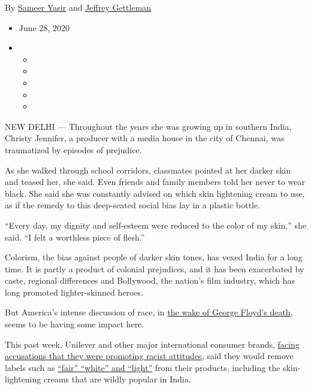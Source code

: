 By \href{https://www.nytimes.com/by/sameer-yasir}{Sameer Yasir} and
\href{https://www.nytimes.com/by/jeffrey-gettleman}{Jeffrey Gettleman}

\begin{itemize}
\item
  June 28, 2020
\item
  \begin{itemize}
  \item
  \item
  \item
  \item
  \item
  \end{itemize}
\end{itemize}

NEW DELHI --- Throughout the years she was growing up in southern India,
Christy Jennifer, a producer with a media house in the city of Chennai,
was traumatized by episodes of prejudice.

As she walked through school corridors, classmates pointed at her darker
skin and teased her, she said. Even friends and family members told her
never to wear black. She said she was constantly advised on which skin
lightening cream to use, as if the remedy to this deep-seated social
bias lay in a plastic bottle.

``Every day, my dignity and self-esteem were reduced to the color of my
skin,'' she said. ``I felt a worthless piece of flesh.''

Colorism, the bias against people of darker skin tones, has vexed India
for a long time. It is partly a product of colonial prejudices, and it
has been exacerbated by caste, regional differences and Bollywood, the
nation's film industry, which has long promoted lighter-skinned heroes.

But America's intense discussion of race, in
\href{https://www.nytimes.com/news-event/george-floyd-protests-minneapolis-new-york-los-angeles?action=click\&pgtype=Article\&state=default\&module=styln-george-floyd\&variant=show\&region=TOP_BANNER\&context=storylines_menu}{the
wake of George Floyd's death}, seems to be having some impact here.

This past week, Unilever and other major international consumer brands,
\href{https://www.nytimes.com/2020/06/13/us/george-floyd-racism-america.html}{facing
accusations that they were promoting racist attitudes}, said they would
remove labels such as
\href{https://www.nytimes.com/2020/06/25/business/unilever-jj-skin-care-lightening.html}{``fair''
``white'' and ``light''} from their products, including the
skin-lightening creams that are wildly popular in India.

